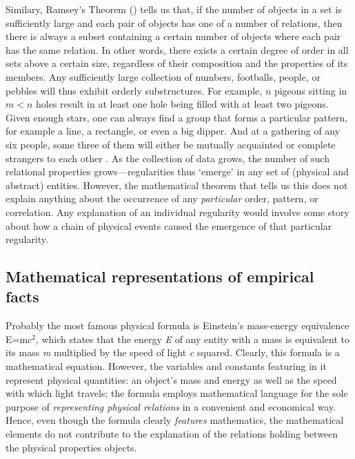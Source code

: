 \documentclass[a4paper,12pt]{article}
\begin{document}
Similary, Ramsey's Theorem (\citeyear{Ramsey1930}) tells us that, if the number of objects in a set is sufficiently large and each pair of objects has one of a number of relations, then there is always a subset containing a certain number of objects where each pair has the same relation. In other words, 
there exists a certain degree of order in all sets above a certain size, regardless of their composition and the properties of its members. Any sufficiently large collection of numbers, footballs, people, or pebbles will thus exhibit orderly substructures. For example, $n$ pigeons sitting in $m<n$ holes result in at least one hole being filled with at least two pigeons. Given enough stars, one can always find a group that forms a particular pattern, for example a line, a rectangle, or even a big dipper. And at a gathering of any six people, some three of them will either be mutually acquainted or complete strangers to each other \cite{Greenwood-Gleason-55,Bostwick-1959}.
As the collection of data grows, the number of such relational properties grows---regularities thus `emerge' in any set of (physical and abstract) entities. However, the mathematical theorem that tells us this does not explain anything about the occurrence of any \textit{particular} order, pattern, or correlation. Any explanation of an individual regularity would involve some story about how a chain of physical events caused the emergence of that particular regularity.


\subsection{Mathematical representations of empirical facts}

Probably the most famous physical formula is Einstein's mass-energy equivalence E=m$c^2$, which states that the energy \textit{E} of any entity with a mass is equivalent to its mass \textit{m} multiplied by the speed of light \textit{c} squared. Clearly, this formula is a mathematical equation. However, the variables and constants featuring in it represent physical quantities: an object's mass and energy as well as the speed with which light travels; the formula employs mathematical language for the sole purpose of \textit{representing physical relations} in a convenient and economical way. Hence, even though the formula clearly \textit{features} mathematics, the mathematical elements do not contribute to the explanation of the relations holding between the physical properties objects. 
\end{document}
